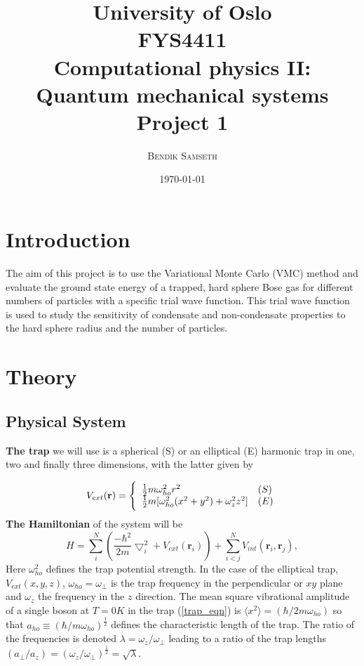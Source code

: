 \documentclass[twocolumn]{article}
\title{ \small
University of Oslo\\
FYS4411\\
Computational physics II: Quantum mechanical systems\\
\huge Project 1 }
\author{\textsc{Bendik Samseth}}
\date{\today}
\begin{document}
\maketitle


\section{Introduction}
The aim of this project is to use the Variational Monte Carlo
(VMC) method and evaluate the ground state energy of a trapped, hard
sphere Bose gas for different numbers of particles with a specific
trial wave function. This trial wave function is used to study the sensitivity of
condensate and non-condensate properties to the hard sphere radius
and the number of particles.  

\section{Theory}
\subsection{Physical System}
\textbf{The trap} we will use is a spherical (S)
or an elliptical (E) harmonic trap in one, two and finally three
dimensions, with the latter given by

\begin{equation}
    V_{ext}(\mathbf{r}) = 
    \Bigg\{
        \begin{array}{ll}
            \frac{1}{2}m\omega_{ho}^2r^2 & (S)\\
            \strut
            \frac{1}{2}m[\omega_{ho}^2(x^2+y^2) + \omega_z^2z^2] & (E)
            \label{trap_eqn}
        \end{array}
\end{equation}
\textbf{The Hamiltonian} of the system will be
\begin{equation}
    H = \sum_i^N \left(\frac{-\hbar^2}{2m}{\bigtriangledown }_{i}^2 +V_{ext}({\mathbf{r}}_i)\right)  +
     \sum_{i<j}^{N}
     V_{int}({\mathbf{r}}_i,{\mathbf{r}}_j),\label{eq:Hamiltonian}
\end{equation}
Here $\omega_{ho}^2$ defines the trap potential strength.  In the case of the
elliptical trap, $V_{ext}(x,y,z)$, $\omega_{ho}=\omega_{\perp}$ is the trap
frequency in the perpendicular or $xy$ plane and $\omega_z$ the frequency in
the $z$ direction.  The mean square vibrational amplitude of a single boson at
$T=0K$ in the trap (\ref{trap_eqn}) is $\langle
x^2\rangle=(\hbar/2m\omega_{ho})$ so that $a_{ho} \equiv
(\hbar/m\omega_{ho})^{\frac{1}{2}}$ defines the characteristic length of the
trap.  The ratio of the frequencies is denoted
$\lambda=\omega_z/\omega_{\perp}$ leading to a ratio of the trap lengths
$(a_{\perp}/a_z)=(\omega_z/\omega_{\perp})^{\frac{1}{2}} = \sqrt{\lambda}$.
\end{document}

